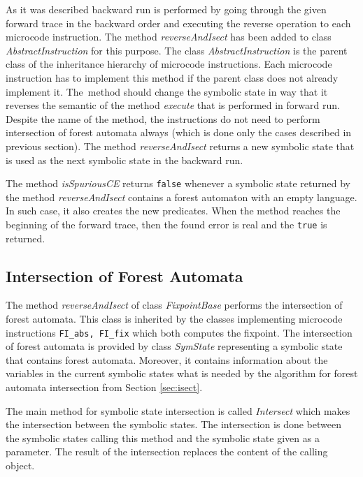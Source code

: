 As it was described backward run is performed by going through the given
forward trace in the backward order and executing the reverse operation to each
microcode instruction.
The method \emph{reverseAndIsect} has been added to class \emph{AbstractInstruction}
for this purpose.
The class \emph{AbstractInstruction} is the parent class of the inheritance hierarchy of
microcode instructions.
Each microcode instruction has to implement this method if the parent class does not
already implement it.
The~method should change the symbolic state in way that it reverses the semantic of
the method \emph{execute} that is performed in forward run.
Despite the name of the method, the instructions do not need to perform
intersection of forest automata always (which is done only the cases described in
previous section).
The method \emph{reverseAndIsect} returns a new symbolic state that
is used as the next symbolic state in the backward run.

The method \emph{isSpuriousCE} returns {\tt false} whenever
a symbolic state returned by the method \emph{reverseAndIsect}
contains a forest automaton with an empty language.
In such case, it also  creates the new predicates.
When the method reaches the beginning of the forward
trace, then the found error is real and the {\tt true}
is returned.

\subsection{Intersection of Forest Automata}
\label{subsec:isectimpl}

The method \emph{reverseAndIsect} of class \emph{FixpointBase}
performs the intersection of forest automata.
This class is inherited by the classes implementing microcode
instructions {\tt FI\_abs, FI\_fix} which both computes the fixpoint.
The intersection of forest automata is provided by class \emph{SymState}
representing a symbolic state that contains forest automata.
Moreover, it contains information about the variables in the current
symbolic states what is needed by the algorithm for forest automata intersection
from Section \ref{sec:isect}.

The main method for symbolic state intersection is called \emph{Intersect}
which makes the intersection between the symbolic states.
The intersection is done between the symbolic states calling
this method and the symbolic state given as a parameter.
The result of the intersection replaces the content of the calling object.

